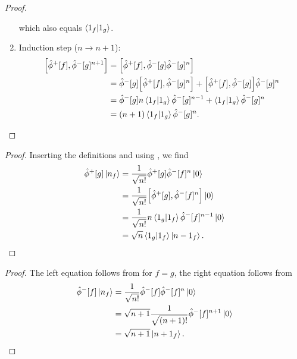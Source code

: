 \begin{proof}
\begin{enumerate}
		which also equals $\braket{1_f}{1_g}$.
		\item Induction step ($n\to n+1$):
		\begin{equation*}
			\begin{split}
				\comm{\hat\phi^+[f]}{\hat\phi^-[g]^{n+1}}
				&=
				\comm{\hat\phi^+[f]}{\hat\phi^-[g]\hat\phi^-[g]^n}
				\\
				&=
				\hat\phi^-[g]
				\comm{\hat\phi^+[f]}{\hat\phi^-[g]^n}
				+
				\comm{\hat\phi^+[f]}{\hat\phi^-[g]}
				\hat\phi^-[g]^n
				\\
				&=
				\hat\phi^-[g]
				n\braket{1_f}{1_g}
				\hat\phi^-[g]^{n-1}
				+
				\braket{1_f}{1_g}
				\hat\phi^-[g]^n
				\\
				&=
				(n+1)
				\braket{1_f}{1_g}
				\hat\phi^-[g]^n
				.
			\end{split}
		\end{equation*}
	\end{enumerate}
\end{proof}
\qkgsmearedpos
\begin{proof}
	Inserting the definitions and using , we find
	\begin{equation*}
		\begin{split}
			\hat\phi^+[g]
			\ket{n_f}
			&=
			\frac{1}{\sqrt{n!}}
			\hat\phi^+[g]
			\hat\phi^-[f]^n
			\ket{0}
			\\
			&=
			\frac{1}{\sqrt{n!}}
			\comm{\hat\phi^+[g]}{\hat\phi^-[f]^n}
			\ket{0}
			\\
			&=
			\frac{1}{\sqrt{n!}}
			n
			\braket{1_g}{1_f}
			\hat\phi^-[f]^{n-1}
			\ket{0}
			\\
			&=
			\sqrt{n}
			\braket{1_g}{1_f}
			\ket{n-1_f}
			.
		\end{split}
	\end{equation*}
\end{proof}
\qkgsmearedpn
\begin{proof}
	The left equation follows from  for $f=g$, the right equation follows from
	\begin{equation*}
		\begin{split}
			\hat\phi^-[f]
			\ket{n_f}
			&=
			\frac{1}{\sqrt{n!}}
			\hat\phi^-[f]
			\hat\phi^-[f]^n
			\ket{0}
			\\
			&=
			\sqrt{n+1}
			\frac{1}{\sqrt{(n+1)!}}
			\hat\phi^-[f]^{n+1}
			\ket{0}
			\\
			&=
			\sqrt{n+1}
			\ket{n+1_f}
			.
		\end{split}
	\end{equation*}
\end{proof}

